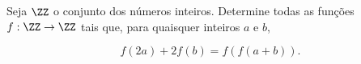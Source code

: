 Seja $\ZZ$ o conjunto dos números inteiros. Determine todas as funções $f : \ZZ \to \ZZ$ tais
que, para quaisquer inteiros $a$ e $b$,

$$f(2a) + 2f(b) = f(f(a + b)).$$